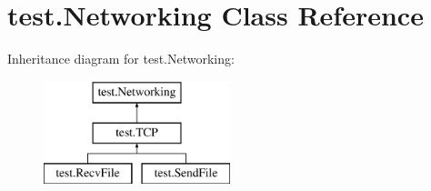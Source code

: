 \hypertarget{classtest_1_1_networking}{}\section{test.\+Networking Class Reference}
\label{classtest_1_1_networking}
Inheritance diagram for test.\+Networking\+:\begin{figure}[H]
\begin{center}
\leavevmode
\includegraphics[height=3.000000cm]{classtest_1_1_networking}
\end{center}
\end{figure}
